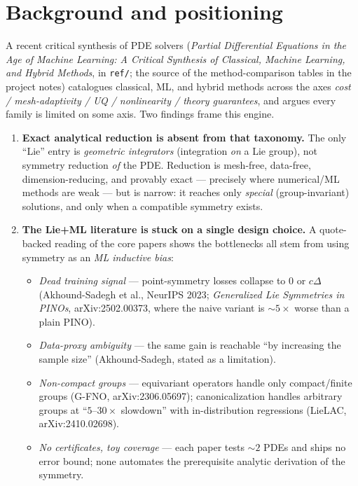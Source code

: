 \documentclass[11pt]{article}
\theoremstyle{definition}
\theoremstyle{remark}
\begin{document}
\section{Background and positioning}

A recent critical synthesis of PDE solvers (\emph{Partial Differential Equations in the Age of
Machine Learning: A Critical Synthesis of Classical, Machine Learning, and Hybrid Methods}, in
\texttt{ref/}; the source of the method-comparison tables in the project notes) catalogues classical,
ML, and hybrid methods across the axes \emph{cost / mesh-adaptivity / UQ / nonlinearity / theory
guarantees}, and argues every family is limited on some axis. Two findings frame this engine.

\begin{enumerate}[nosep]
  \item \textbf{Exact analytical reduction is absent from that taxonomy.} The only ``Lie'' entry is
        \emph{geometric integrators} (integration \emph{on} a Lie group), not symmetry reduction
        \emph{of} the PDE. Reduction is mesh-free, data-free, dimension-reducing, and provably exact
        --- precisely where numerical/ML methods are weak --- but is narrow: it reaches only
        \emph{special} (group-invariant) solutions, and only when a compatible symmetry exists.
  \item \textbf{The Lie+ML literature is stuck on a single design choice.} A quote-backed reading of
        the core papers shows the bottlenecks all stem from using symmetry as an \emph{ML inductive
        bias}:
        \begin{itemize}[nosep]
          \item \emph{Dead training signal} --- point-symmetry losses collapse to $0$ or $c\Delta$
                (Akhound-Sadegh et al., NeurIPS 2023; \emph{Generalized Lie Symmetries in PINOs},
                arXiv:2502.00373, where the naive variant is $\sim 5\times$ worse than a plain PINO).
          \item \emph{Data-proxy ambiguity} --- the same gain is reachable ``by increasing the sample
                size'' (Akhound-Sadegh, stated as a limitation).
          \item \emph{Non-compact groups} --- equivariant operators handle only compact/finite groups
                (G-FNO, arXiv:2306.05697); canonicalization handles arbitrary groups at
                ``$5\text{--}30\times$ slowdown'' with in-distribution regressions (LieLAC,
                arXiv:2410.02698).
          \item \emph{No certificates, toy coverage} --- each paper tests $\sim 2$ PDEs and ships no
                error bound; none automates the prerequisite analytic derivation of the symmetry.
        \end{itemize}
\end{enumerate}
\end{document}
